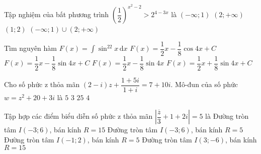 \begin{ex}%
	Tập nghiệm của bất phương trình $\left(\dfrac{1}{2}\right)^{x^2-2}>2^{4-3x}$ là
	\choice
	{$(-\infty; 1)$}
	{$(2;+\infty)$}
	{\True $(1; 2)$}
	{$(-\infty; 1)\cup(2;+\infty)$}
\end{ex}
\begin{ex}%
	Tìm nguyên hàm $F(x)=\displaystyle\int\sin^22x\mathrm{\,d}x$
	\choice
	{$F(x)=\dfrac{1}{2}x-\dfrac{1}{8}\cos 4x+C$}
	{\True $F(x)=\dfrac{1}{2}x-\dfrac{1}{8}\sin 4x+C$}
	{$F(x)=\dfrac{1}{2}x-\dfrac{1}{8}\sin 4x$}
	{$F(x)=\dfrac{1}{2}x+\dfrac{1}{8}\sin 4x+C$}
\end{ex}
\begin{ex}%
	Cho số phức z thỏa mãn $(2-i)z+\dfrac{1+5i}{1+i}=7+10i$. Mô-đun của số phức $w=z^2+20+3i$ là
	\choice
	{\True $ 5 $}
	{$ 3 $}
	{$ 25 $}
	{$ 4 $}
\end{ex}
\begin{ex}%
	Tập hợp các điểm biểu diễn số phức z thỏa mãn $\left|\dfrac{\overline{z}}{3}+1+2i\right|=5$ là
	\choice
	{\True Đường tròn tâm $I(-3; 6)$, bán kính $R=15$}
	{Đường tròn tâm $I(-3; 6)$, bán kính $R=5$}
	{Đường tròn tâm $I(-1; 2)$, bán kính $R=5$}
	{Đường tròn tâm $I(3;-6)$, bán kính $R=15$}
\end{ex}
